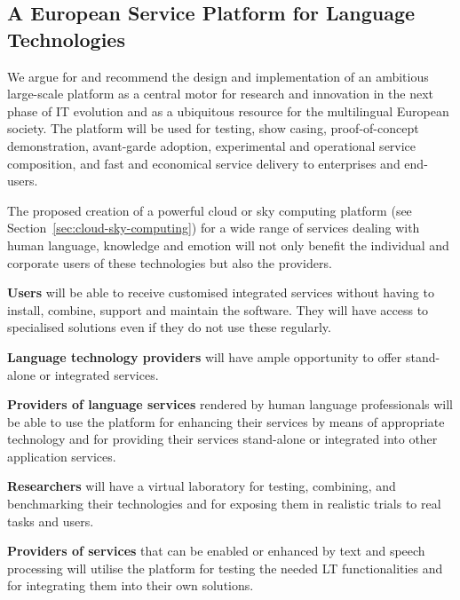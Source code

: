 \documentclass[10pt, plain]{../../metanetpaper}
\begin{document}
\begin{multicols}{2}

\subsection{A European Service Platform for Language Technologies}
\label{sec:europ-service-platform}

%

We argue for and recommend the design and implementation of an ambitious large-scale platform as a central motor for research and innovation in the next phase of IT evolution and as a ubiquitous resource for the multilingual European society. The platform will be used for testing, show casing, proof-of-concept demonstration, avant-garde adoption, experimental and operational service composition, and fast and economical service delivery to enterprises and end-users.
 
The proposed creation of a powerful cloud or sky computing platform (see Section~\ref{sec:cloud-sky-computing}) for a wide range of services dealing with human language, knowledge and emotion will not only benefit the individual and corporate users of these technologies but also the providers.
 
\textbf{Users} will be able to receive customised integrated services without having to install, combine, support and maintain the software. They will have access to specialised solutions even if they do not use these regularly.
 
\textbf{Language technology providers} will have ample opportunity to offer stand-alone or integrated services.
 
\textbf{Providers of language services} rendered by human language professionals will be able to use the platform for enhancing their services by means of appropriate technology and for providing their services stand-alone or integrated into other application services.
 
\textbf{Researchers} will have a virtual laboratory for testing, combining, and benchmarking their technologies and for exposing them in realistic trials to real tasks and users.
 
\textbf{Providers of services} that can be enabled or enhanced by text and speech processing will utilise the platform for testing the needed LT functionalities and for integrating them into their own solutions.


\end{multicols}
\end{document}
